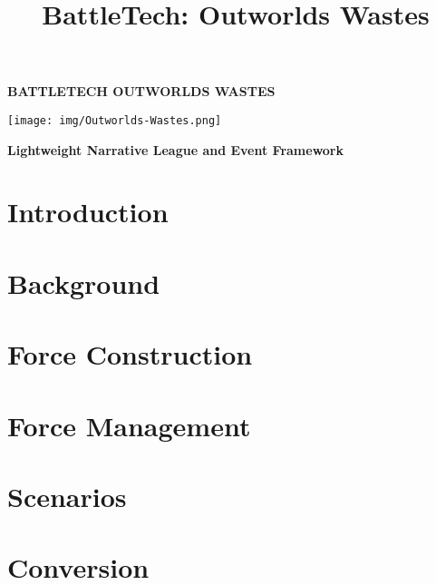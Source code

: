 \documentclass{article}
\title{BattleTech: Outworlds Wastes}
\author{}
\date{}
\newcommand{\mysectiontitle}{}
\newcommand{\newsection}[2]{\renewcommand{\mysectiontitle}{#2}\section{#1}}
\begin{document}
\makeatletter
{}

\begin{center}
  \fontsize{50}{60}\bfseries\selectfont\MakeUppercase{BattleTech}
  \fontsize{30}{37}\bfseries\selectfont\MakeUppercase{Outworlds Wastes}

  \texttt{[image: img/Outworlds-Wastes.png]}

  \LARGE\bfseries{Lightweight Narrative League and Event Framework}
\end{center}

\newsection{Introduction}{introduction}



\newpage

\newsection{Background}{background}



\newsection{Force Construction}{force-construction}



\newpage

\newsection{Force Management}{force-management}



\newpage

\newsection{Scenarios}{scenarios}
\label{sec:scenarios}



\newpage

\newsection{Conversion}{conversion}
\label{sec:conversion}
\end{document}
